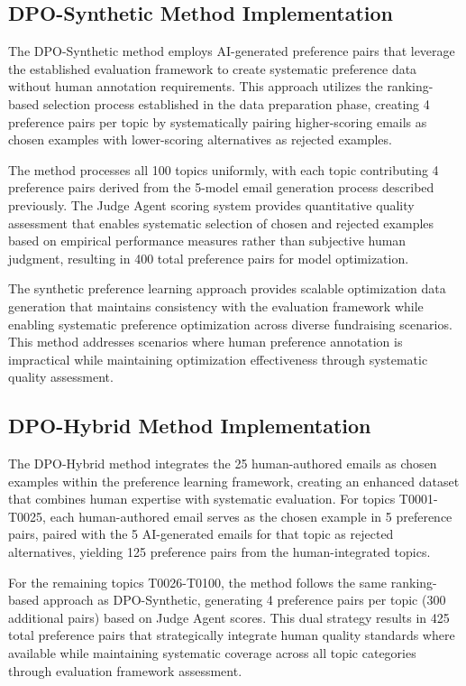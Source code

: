 \subsection{DPO-Synthetic Method Implementation}

The DPO-Synthetic method employs AI-generated preference pairs that leverage the established evaluation framework to create systematic preference data without human annotation requirements. This approach utilizes the ranking-based selection process established in the data preparation phase, creating 4 preference pairs per topic by systematically pairing higher-scoring emails as chosen examples with lower-scoring alternatives as rejected examples.

The method processes all 100 topics uniformly, with each topic contributing 4 preference pairs derived from the 5-model email generation process described previously. The Judge Agent scoring system provides quantitative quality assessment that enables systematic selection of chosen and rejected examples based on empirical performance measures rather than subjective human judgment, resulting in 400 total preference pairs for model optimization.

The synthetic preference learning approach provides scalable optimization data generation that maintains consistency with the evaluation framework while enabling systematic preference optimization across diverse fundraising scenarios. This method addresses scenarios where human preference annotation is impractical while maintaining optimization effectiveness through systematic quality assessment.

\subsection{DPO-Hybrid Method Implementation}

The DPO-Hybrid method integrates the 25 human-authored emails as chosen examples within the preference learning framework, creating an enhanced dataset that combines human expertise with systematic evaluation. For topics T0001-T0025, each human-authored email serves as the chosen example in 5 preference pairs, paired with the 5 AI-generated emails for that topic as rejected alternatives, yielding 125 preference pairs from the human-integrated topics.

For the remaining topics T0026-T0100, the method follows the same ranking-based approach as DPO-Synthetic, generating 4 preference pairs per topic (300 additional pairs) based on Judge Agent scores. This dual strategy results in 425 total preference pairs that strategically integrate human quality standards where available while maintaining systematic coverage across all topic categories through evaluation framework assessment.

